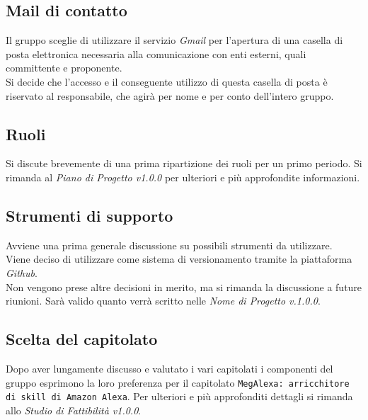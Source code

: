 \documentclass[a4paper,12pt]{article}
\begin{document}
	\subsection{Mail di contatto}
	Il gruppo sceglie di utilizzare il servizio \textit{Gmail} per l'apertura di una casella di posta elettronica necessaria alla comunicazione con enti esterni, quali committente e proponente.\\
	Si decide che l'accesso e il conseguente utilizzo di questa casella di posta è riservato al responsabile, che agirà per nome e per conto dell'intero gruppo. 
	\subsection{Ruoli}
	Si discute brevemente di una prima ripartizione dei ruoli per un primo periodo. Si rimanda al \textit{Piano di Progetto v1.0.0} per ulteriori e più approfondite informazioni.
	\subsection{Strumenti di supporto}
	Avviene una prima generale discussione su possibili strumenti da utilizzare. \\
	Viene deciso di utilizzare  come sistema di versionamento tramite la piattaforma \textit{Github}. \\
	Non vengono prese altre decisioni in merito, ma si rimanda la discussione a future riunioni. 
	Sarà valido quanto verrà scritto nelle \textit{Nome di Progetto v.1.0.0}.
	\subsection{Scelta del capitolato}
	Dopo aver lungamente discusso e valutato i vari capitolati i componenti del gruppo esprimono la loro preferenza per il capitolato \texttt{MegAlexa: arricchitore di skill di Amazon Alexa}. Per ulteriori e più approfonditi dettagli si rimanda allo \textit{Studio di Fattibilità v1.0.0}.
	\label{LastPage}
\end{document}
